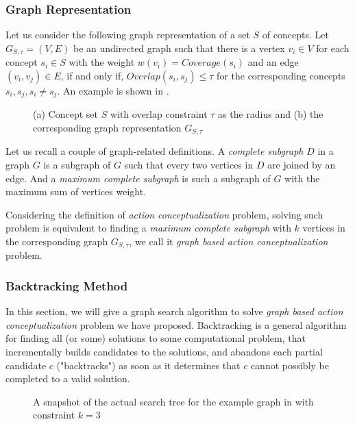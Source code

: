 \subsubsection{Graph Representation}
Let us consider the following graph representation of a set $S$ of concepts. Let $G_{S,\tau}=(V,E)$ be an undirected graph such that there is a vertex $v_i\in V$ for each concept $s_i\in S$ with the weight $w(v_i)=Coverage(s_i)$ and an edge $(v_i,v_j)\in E$, if and only if, $Overlap(s_i,s_j)\leq \tau$ for the corresponding concepts $s_i,s_j,s_i\neq s_j$. An example is shown in .
\begin{figure}[th]
\centering
{}
\caption{(a) Concept set $S$ with overlap constraint $\tau$ as the radius and (b) the corresponding graph representation $G_{S,\tau}$}
\label{fig:graph_model}
\end{figure}

Let us recall a couple of graph-related definitions. A \emph{complete subgraph} $D$ in a graph $G$ is a subgraph of $G$ such that every two vertices in $D$ are joined by an edge. And a \emph{maximum complete subgraph} is such a subgraph of $G$ with the maximum sum of vertices weight.

Considering the definition of \emph{action conceptualization} problem, solving such problem is equivalent to finding a \emph{maximum complete subgraph} with $k$ vertices in the corresponding graph  $G_{S,\tau}$, we call it \emph{graph based action conceptualization} problem.

\subsubsection{Backtracking Method}
In this section, we will give a graph search algorithm to solve \emph{graph based action conceptualization} problem we have proposed.
Backtracking is a general algorithm for finding all (or some) solutions to some computational problem, that incrementally builds candidates to the solutions, and abandons each partial candidate $c$ ("backtracks") as soon as it determines that $c$ cannot possibly be completed to a valid solution.
\begin{figure}[th]
\centering
{}
\caption{A snapshot of the actual search tree for the example graph in  with constraint $k=3$}
\label{fig:search_tree}
\end{figure}
